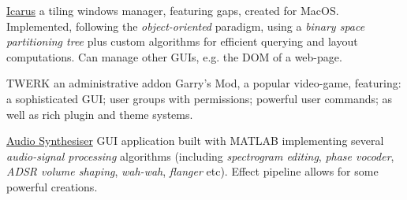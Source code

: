 
\begin{cvopensource}

  \cvproject
    {\href{https://github.com/Braden1996/Icarus}{Icarus}} %
    {
      a tiling windows manager, featuring gaps, created for MacOS. Implemented, following the \textit{object-oriented} paradigm, using a \textit{binary space partitioning tree} plus custom algorithms for efficient querying and layout computations. Can manage other GUIs, e.g. the DOM of a web-page.
    }

  \cvproject
    {TWERK} %
    {
      an administrative addon Garry's Mod, a popular video-game, featuring: a sophisticated GUI; user groups with permissions; powerful user commands; as well as rich plugin and theme systems.
    }

  \cvproject
    {\href{https://github.com/Braden1996/Audio-Synthesiser}{Audio Synthesiser}} %
    {
      GUI application built with MATLAB implementing several \textit{audio-signal processing} algorithms (including \textit{spectrogram editing}, \textit{phase vocoder}, \textit{ADSR volume shaping}, \textit{wah-wah}, \textit{flanger} etc). Effect pipeline allows for some powerful creations.
    }
\end{cvopensource}
